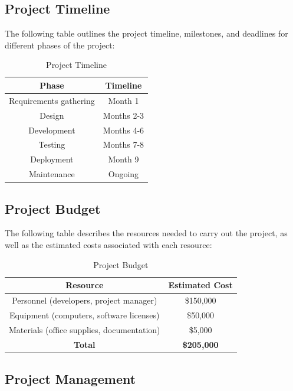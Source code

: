 \documentclass{article}
\begin{document}
\subsection{Project Timeline}

The following table outlines the project timeline, milestones, and deadlines for different phases of the project:

\begin{table}[htbp]
\centering
\caption{Project Timeline}
\begin{tabular}{|c|c|}
\hline
\textbf{Phase} & \textbf{Timeline} \\
\hline
Requirements gathering & Month 1 \\
Design & Months 2-3 \\
Development & Months 4-6 \\
Testing & Months 7-8 \\
Deployment & Month 9 \\
Maintenance & Ongoing \\
\hline
\end{tabular}%
\label{tab:timeline}%
\end{table}%

\subsection{Project Budget}

The following table describes the resources needed to carry out the project, as well as the estimated costs associated with each resource:

\begin{table}[htbp]
\centering
\caption{Project Budget}
\begin{tabular}{|c|c|}
\hline
\textbf{Resource} & \textbf{Estimated Cost} \\
\hline
Personnel (developers, project manager) & \$150,000 \\
Equipment (computers, software licenses) & \$50,000 \\
Materials (office supplies, documentation) & \$5,000 \\
\hline
\textbf{Total} & \textbf{\$205,000} \\
\hline
\end{tabular}%
\label{tab:budget}%
\end{table}%

\subsection{Project Management}
\end{document}
